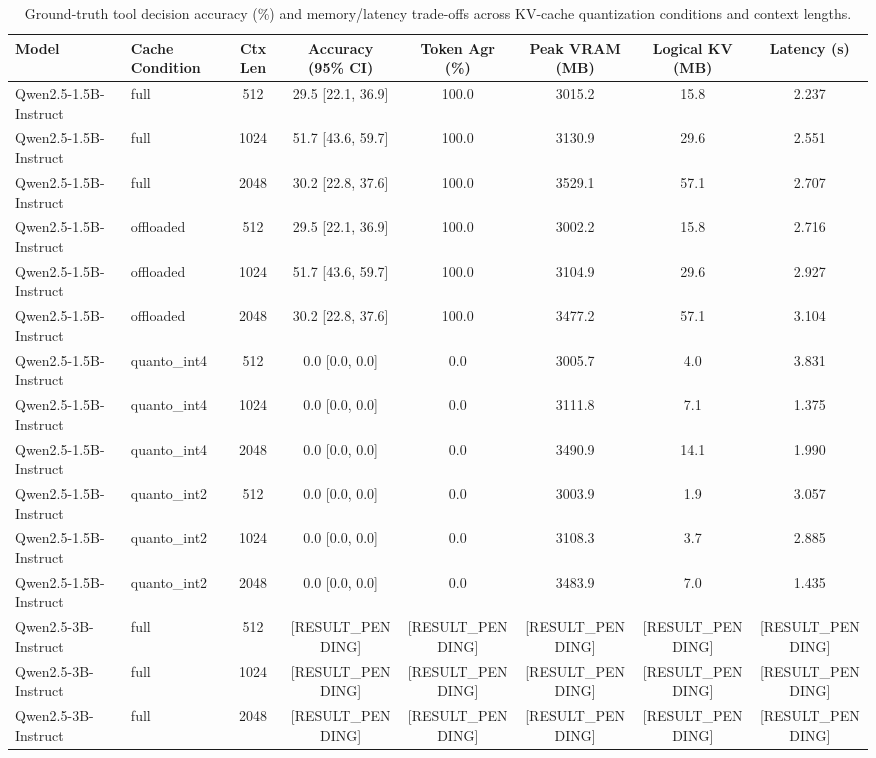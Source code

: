 \begin{table}[t]
\centering
\small
\caption{Ground-truth tool decision accuracy (\%) and memory/latency trade-offs across KV-cache quantization conditions and context lengths.}
\label{tab:main_results}
\begin{tabular}{llcccccc}
\toprule
\textbf{Model} & \textbf{Cache Condition} & \textbf{Ctx Len} & \textbf{Accuracy (95\% CI)} & \textbf{Token Agr (\%)} & \textbf{Peak VRAM (MB)} & \textbf{Logical KV (MB)} & \textbf{Latency (s)} \\
\midrule
Qwen2.5-1.5B-Instruct & full & 512 & 29.5 [22.1, 36.9] & 100.0 & 3015.2 & 15.8 & 2.237 \\
Qwen2.5-1.5B-Instruct & full & 1024 & 51.7 [43.6, 59.7] & 100.0 & 3130.9 & 29.6 & 2.551 \\
Qwen2.5-1.5B-Instruct & full & 2048 & 30.2 [22.8, 37.6] & 100.0 & 3529.1 & 57.1 & 2.707 \\
\hline
Qwen2.5-1.5B-Instruct & offloaded & 512 & 29.5 [22.1, 36.9] & 100.0 & 3002.2 & 15.8 & 2.716 \\
Qwen2.5-1.5B-Instruct & offloaded & 1024 & 51.7 [43.6, 59.7] & 100.0 & 3104.9 & 29.6 & 2.927 \\
Qwen2.5-1.5B-Instruct & offloaded & 2048 & 30.2 [22.8, 37.6] & 100.0 & 3477.2 & 57.1 & 3.104 \\
\hline
Qwen2.5-1.5B-Instruct & quanto_int4 & 512 & 0.0 [0.0, 0.0] & 0.0 & 3005.7 & 4.0 & 3.831 \\
Qwen2.5-1.5B-Instruct & quanto_int4 & 1024 & 0.0 [0.0, 0.0] & 0.0 & 3111.8 & 7.1 & 1.375 \\
Qwen2.5-1.5B-Instruct & quanto_int4 & 2048 & 0.0 [0.0, 0.0] & 0.0 & 3490.9 & 14.1 & 1.990 \\
\hline
Qwen2.5-1.5B-Instruct & quanto_int2 & 512 & 0.0 [0.0, 0.0] & 0.0 & 3003.9 & 1.9 & 3.057 \\
Qwen2.5-1.5B-Instruct & quanto_int2 & 1024 & 0.0 [0.0, 0.0] & 0.0 & 3108.3 & 3.7 & 2.885 \\
Qwen2.5-1.5B-Instruct & quanto_int2 & 2048 & 0.0 [0.0, 0.0] & 0.0 & 3483.9 & 7.0 & 1.435 \\
\hline
Qwen2.5-3B-Instruct & full & 512 & [RESULT_PENDING] & [RESULT_PENDING] & [RESULT_PENDING] & [RESULT_PENDING] & [RESULT_PENDING] \\
Qwen2.5-3B-Instruct & full & 1024 & [RESULT_PENDING] & [RESULT_PENDING] & [RESULT_PENDING] & [RESULT_PENDING] & [RESULT_PENDING] \\
Qwen2.5-3B-Instruct & full & 2048 & [RESULT_PENDING] & [RESULT_PENDING] & [RESULT_PENDING] & [RESULT_PENDING] & [RESULT_PENDING] \\

\end{tabular}
\end{table}
